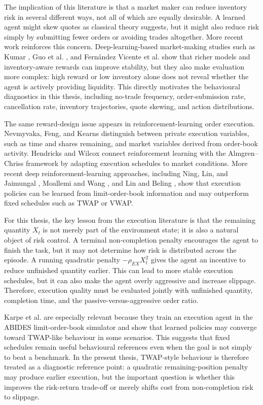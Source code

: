 \documentclass[oneside]{uva-inf-bachelor-thesis}
\begin{document}
The implication of this literature is that a market maker can reduce inventory risk in several different ways, not all of which are equally desirable. A learned agent might skew quotes as classical theory suggests, but it might also reduce risk simply by submitting fewer orders or avoiding trades altogether. More recent work reinforces this concern. Deep-learning-based market-making studies such as Kumar \cite{kumar_deep_2020}, Guo et al. \cite{guo_market_2023}, and Fernández Vicente et al. \cite{vicente_automated_2023} show that richer models and inventory-aware rewards can improve stability, but they also make evaluation more complex: high reward or low inventory alone does not reveal whether the agent is actively providing liquidity. This directly motivates the behavioural diagnostics in this thesis, including no-trade frequency, order-submission rate, cancellation rate, inventory trajectories, quote skewing, and action distributions.

The same reward-design issue appears in reinforcement-learning order execution. Nevmyvaka, Feng, and Kearns \cite{nevmyvaka_reinforcement_2006} distinguish between private execution variables, such as time and shares remaining, and market variables derived from order-book activity. Hendricks and Wilcox \cite{hendricks_reinforcement_2014} connect reinforcement learning with the Almgren--Chriss framework by adapting execution schedules to market conditions. More recent deep reinforcement-learning approaches, including Ning, Lin, and Jaimungal \cite{ning_double_2020}, Moallemi and Wang \cite{moallemi_reinforcement_2021}, and Lin and Beling \cite{lin_end--end_2020}, show that execution policies can be learned from limit-order-book information and may outperform fixed schedules such as TWAP or VWAP.

For this thesis, the key lesson from the execution literature is that the remaining quantity \(X_t\) is not merely part of the environment state; it is also a natural object of risk control. A terminal non-completion penalty encourages the agent to finish the task, but it may not determine how risk is distributed across the episode. A running quadratic penalty \(-\rho_{EX}X_t^2\) gives the agent an incentive to reduce unfinished quantity earlier. This can lead to more stable execution schedules, but it can also make the agent overly aggressive and increase slippage. Therefore, execution quality must be evaluated jointly with unfinished quantity, completion time, and the passive-versus-aggressive order ratio.

Karpe et al. \cite{karpe_multi-agent_2020} are especially relevant because they train an execution agent in the ABIDES limit-order-book simulator and show that learned policies may converge toward TWAP-like behaviour in some scenarios. This suggests that fixed schedules remain useful behavioural references even when the goal is not simply to beat a benchmark. In the present thesis, TWAP-style behaviour is therefore treated as a diagnostic reference point: a quadratic remaining-position penalty may produce earlier execution, but the important question is whether this improves the risk-return trade-off or merely shifts cost from non-completion risk to slippage.
\end{document}
